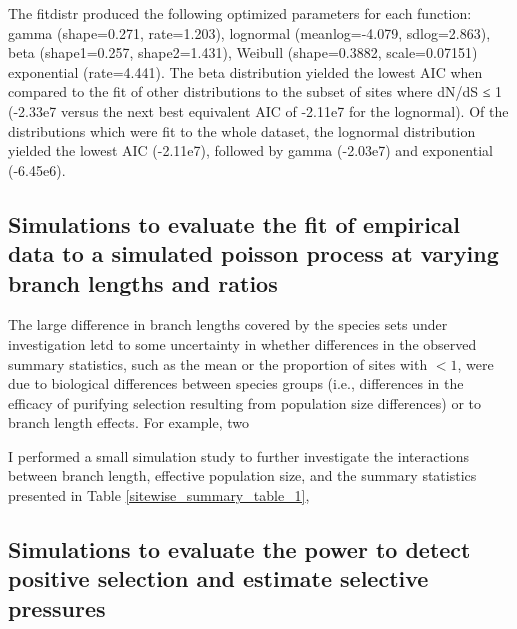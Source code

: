 The fitdistr produced the following optimized parameters for each
function: gamma (shape=0.271, rate=1.203), lognormal (meanlog=-4.079,
sdlog=2.863), beta (shape1=0.257, shape2=1.431), Weibull
(shape=0.3882, scale=0.07151) exponential (rate=4.441). The beta
distribution yielded the lowest AIC when compared to the fit of other
distributions to the subset of sites where dN/dS ≤ 1 (-2.33e7 versus
the next best equivalent AIC of -2.11e7 for the lognormal). Of the
distributions which were fit to the whole dataset, the lognormal
distribution yielded the lowest AIC (-2.11e7), followed by gamma
(-2.03e7) and exponential (-6.45e6).


\subsection{Simulations to evaluate the fit of empirical data to a simulated poisson process at varying branch lengths and \omg ratios}
\label{poisson_sims}

The large difference in branch lengths covered by the species sets
under investigation letd to some uncertainty in whether differences in
the observed summary statistics, such as the mean \omgml or the
proportion of sites with \omgml$<1$, were due to biological
differences between species groups (i.e., differences in the efficacy
of purifying selection resulting from population size differences) or
to branch length effects. For example, two 

I performed a small simulation
study to further investigate the interactions between branch length,
effective population size, and the summary statistics presented in
Table \ref{sitewise_summary_table_1},


\subsection{Simulations to evaluate the power to detect positive selection and estimate selective pressures}



